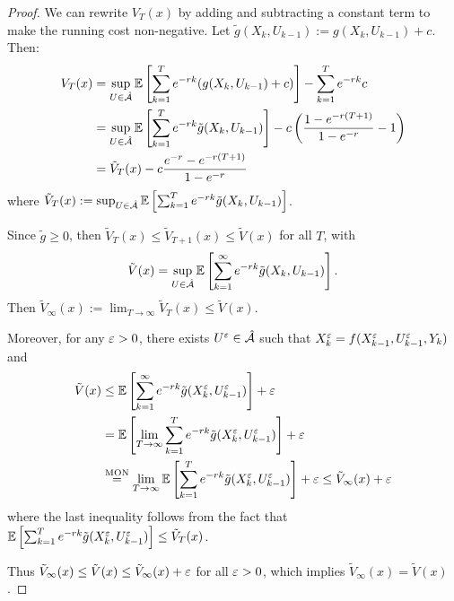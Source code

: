 \begin{proof}
    We can rewrite $V_T(x)$ by adding and subtracting a constant term to make the running cost non-negative. Let $\tilde{g}(X_k, U_{k-1}) := g(X_k, U_{k-1}) + c$. Then:
    \begin{align*}
        V_T(x) &= \sup_{U \in \hat{\mathcal{A}}} \mathbb E \left[ \sum_{k=1}^T e^{-rk} (g(X_k, U_{k-1}) + c) \right] - \sum_{k=1}^T e^{-rk} c \\
        &= \sup_{U \in \hat{\mathcal{A}}} \mathbb E \left[ \sum_{k=1}^T e^{-rk} \tilde{g}(X_k, U_{k-1}) \right] - c \left( \frac{1 - e^{-r(T+1)}}{1 - e^{-r}} - 1 \right) \\
        &= \tilde{V}_T(x) - c \frac{e^{-r} - e^{-r(T+1)}}{1 - e^{-r}}
    \end{align*}
    where $\tilde{V}_T(x) := \sup_{U \in \hat{\mathcal{A}}} \mathbb E \left[ \sum_{k=1}^T e^{-rk} \tilde{g}(X_k, U_{k-1}) \right]$.
    
    Since $\tilde{g} \geq 0$, then $\tilde{V}_T(x) \leq \tilde{V}_{T+1}(x) \leq \tilde{V}(x)$ for all $T$, with 
    \[ \tilde{V}(x) = \sup_{U \in \hat{\mathcal{A}}} \mathbb E \left[ \sum_{k=1}^\infty e^{-rk} \tilde{g}(X_k, U_{k-1}) \right]. \]
    Then $\tilde{V}_\infty(x) := \lim_{T \to \infty} \tilde{V}_T(x) \leq \tilde{V}(x)$.
    
    Moreover, for any $\varepsilon > 0$, there exists $U^\varepsilon \in \hat{\mathcal{A}}$ such that $X_k^\varepsilon = f(X_{k-1}^\varepsilon, U_{k-1}^\varepsilon, Y_k)$ and
    \begin{align*}
        \tilde{V}(x) &\leq \mathbb E \left[ \sum_{k=1}^\infty e^{-rk} \tilde{g}(X_k^\varepsilon, U_{k-1}^\varepsilon) \right] + \varepsilon \\
        &= \mathbb E \left[ \lim_{T \to \infty} \sum_{k=1}^T e^{-rk} \tilde{g}(X_k^\varepsilon, U_{k-1}^\varepsilon) \right] + \varepsilon \\
        &\overset{\text{MON}}{=} \lim_{T \to \infty} \mathbb E \left[ \sum_{k=1}^T e^{-rk} \tilde{g}(X_k^\varepsilon, U_{k-1}^\varepsilon) \right] + \varepsilon \leq \tilde{V}_\infty(x) + \varepsilon
    \end{align*}
    where the last inequality follows from the fact that $\mathbb E \left[ \sum_{k=1}^T e^{-rk} \tilde{g}(X_k^\varepsilon, U_{k-1}^\varepsilon) \right] \leq \tilde{V}_T(x)$.
    
    Thus $\tilde{V}_\infty(x) \leq \tilde{V}(x) \leq \tilde{V}_\infty(x) + \varepsilon$ for all $\varepsilon > 0$, which implies $\tilde{V}_\infty(x) = \tilde{V}(x)$.
    

\end{proof}
